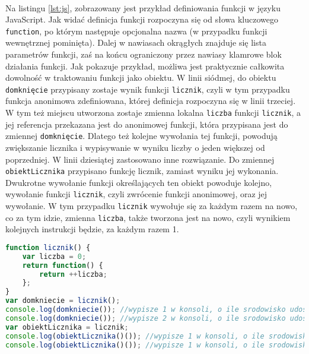 \documentclass[a4paper,10pt]{report}
\begin{document}
\paragraph{}
Na listingu \ref{lst:js}, zobrazowany jest przykład definiowania funkcji w języku JavaScript. Jak widać definicja funkcji rozpoczyna się od słowa kluczowego \verb|function|, po którym następuje opcjonalna nazwa (w przypadku funkcji wewnętrznej pominięta). Dalej w nawiasach okrągłych znajduje się lista parametrów funkcji, zaś na końcu ograniczony przez nawiasy klamrowe blok działania funkcji. Jak pokazuje przykład, możliwa jest praktycznie całkowita dowolność w traktowaniu funkcji jako obiektu. W linii siódmej, do obiektu \verb|domknięcie| przypisany zostaje wynik funkcji \verb|licznik|, czyli w tym przypadku funkcja anonimowa zdefiniowana, której definicja rozpoczyna się w linii trzeciej. W tym też miejscu utworzona zostaje zmienna lokalna \verb|liczba| funkcji \verb|licznik|, a jej referencja przekazana jest do anonimowej funkcji, która przypisana jest do zmiennej \verb|domknięcie|. Dlatego też kolejne wywołania tej funkcji, powodują zwiększanie licznika i wypisywanie w wyniku liczby o jeden większej od poprzedniej. W linii dziesiątej zastosowano inne rozwiązanie. Do zmiennej \verb|obiektLicznika| przypisano funkcję licznik, zamiast wyniku jej wykonania. Dwukrotne wywołanie funkcji określających ten obiekt powoduje kolejno, wywołanie funkcji \verb|licznik|, czyli zwrócenie funkcji anonimowej, oraz jej wywołanie. W tym przypadku \verb|licznik| wywołuje się za każdym razem na nowo, co za tym idzie, zmienna \verb|liczba|, także tworzona jest na nowo, czyli wynikiem kolejnych instrukcji będzie, za każdym razem 1.
\begin{lstlisting}[caption={Funkcyjność w języku javascript},label={lst:js},language=Javascript]
function licznik() {
	var liczba = 0;
	return function() {
		return ++liczba;
	};
}
var domkniecie = licznik();
console.log(domkniecie()); //wypisze 1 w konsoli, o ile srodowisko udostepnia obiekt console
console.log(domkniecie()); //wypisze 2 w konsoli, o ile srodowisko udostepnia obiekt console
var obiektLicznika = licznik;
console.log(obiektLicznika()()); //wypisze 1 w konsoli, o ile srodowisko udostepnia obiekt console
console.log(obiektLicznika()()); //wypisze 1 w konsoli, o ile srodowisko udostepnia obiekt console
\end{lstlisting}
\end{document}
